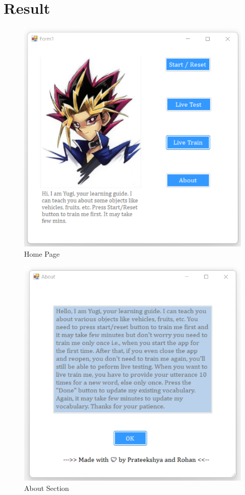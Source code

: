 \documentclass{article}
\begin{document}
\section{Result}
\begin{figure}
\includegraphics[scale=1.0]{homepage.png}
\caption{Home Page}
\label{fig:hp}
\end{figure}
\begin{figure}
\includegraphics[scale=1.0]{about.png}
\caption{About Section}
\label{fig:about}
\end{figure}
\end{document}
